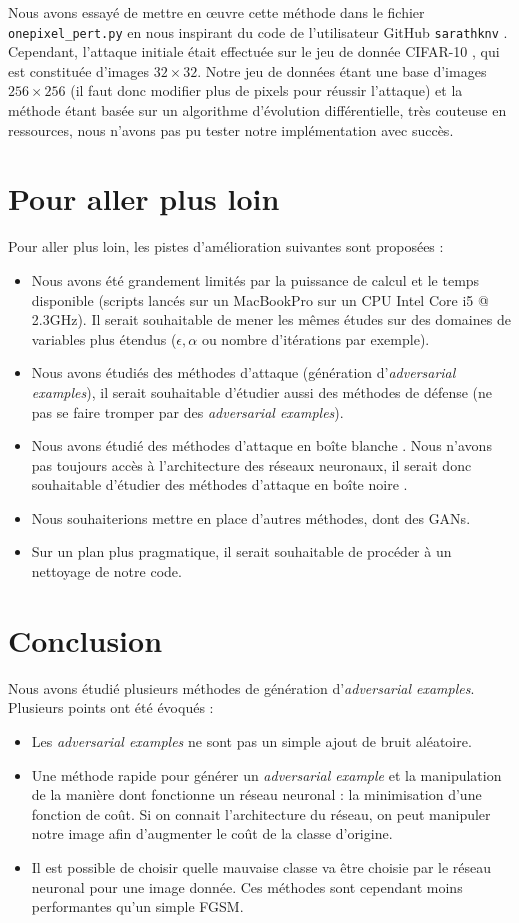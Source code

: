 \documentclass[10pt,twocolumn,letterpaper]{article}
\begin{document}
Nous avons essayé de mettre en œuvre cette méthode dans le fichier \texttt{onepixel\_pert.py} en nous inspirant du code de l'utilisateur GitHub \texttt{sarathknv} \cite{sarath2018}. Cependant, l'attaque initiale était effectuée sur le jeu de donnée CIFAR-10 \cite{krizhevsky2009}, qui est constituée d'images $32\times 32$. Notre jeu de données étant une base d'images $256\times 256$ (il faut donc modifier plus de pixels pour réussir l'attaque) et la méthode étant basée sur un algorithme d'évolution différentielle, très couteuse en ressources, nous n'avons pas pu tester notre implémentation avec succès.

\section{Pour aller plus loin}
Pour aller plus loin, les pistes d'amélioration suivantes sont proposées :

\begin{itemize}
\item Nous avons été grandement limités par la puissance de calcul  et le temps disponible (scripts lancés sur un MacBookPro sur un CPU Intel Core i5 @ 2.3GHz). Il serait souhaitable de mener les mêmes études sur des domaines de variables plus étendus ($\epsilon, \alpha$ ou nombre d'itérations par exemple).
\item Nous avons étudiés des méthodes d'attaque (génération d'\textit{adversarial examples}), il serait souhaitable d'étudier aussi des méthodes de défense (ne pas se faire tromper par des \textit{adversarial examples}).
\item Nous avons étudié des méthodes d'attaque en \og boîte blanche \fg{}. Nous n'avons pas toujours accès à l'architecture des réseaux neuronaux, il serait donc souhaitable d'étudier des méthodes d'attaque en \og boîte noire \fg{}.
\item Nous souhaiterions mettre en place d'autres méthodes, dont des GANs.
\item Sur un plan plus pragmatique, il serait souhaitable de procéder à un nettoyage de notre code.
\end{itemize}

\section{Conclusion}
Nous avons étudié plusieurs méthodes de génération d'\textit{adversarial examples}.
Plusieurs points ont été évoqués :
\begin{itemize}
\item Les \textit{adversarial examples} ne sont pas un simple ajout de bruit aléatoire.
\item Une méthode rapide pour générer un \textit{adversarial example} et la manipulation de la manière dont fonctionne un réseau neuronal : la minimisation d'une fonction de coût. Si on connait l'architecture du réseau, on peut manipuler notre image afin d'augmenter le coût de la classe d'origine.
\item Il est possible de choisir quelle mauvaise classe va être choisie par le réseau neuronal pour une image donnée. Ces méthodes sont cependant moins performantes qu'un simple FGSM.
\end{itemize}

{\small


}
\end{document}
